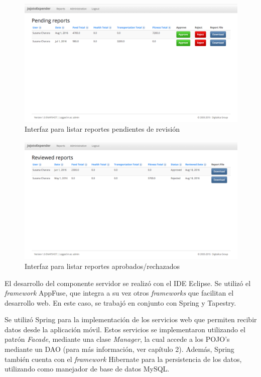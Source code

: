 \begin{figure}[ht]
  \centering
  \includegraphics[scale=0.45,type=png,ext=.png,read=.png]{imagenes/pending_reports}
  \caption{Interfaz para listar reportes pendientes de revisión}
  \label{fig:interfazListarReportesPendientes}
\end{figure}

\begin{figure}[ht]
  \centering
  \includegraphics[scale=0.45,type=png,ext=.png,read=.png]{imagenes/reviewed_reports}
  \caption{Interfaz para listar reportes aprobados/rechazados}
  \label{fig:interfazListarReportesRevisados}
\end{figure}

El desarrollo del componente servidor se realizó con el IDE Eclipse. Se utilizó el \textit{framework} AppFuse, que integra a su vez otros \textit{frameworks} que facilitan el desarrollo web. En este caso, se trabajó en conjunto con Spring y Tapestry.

Se utilizó Spring para la implementación de los servicios web que permiten recibir datos desde la aplicación móvil. Estos servicios se implementaron utilizando el patrón \textit{Facade}, mediante una clase \textit{Manager}, la cual accede a los POJO's mediante un DAO (para más información, ver capítulo 2). Además, Spring también cuenta con el \textit{framework} Hibernate para la persistencia de los datos, utilizando como manejador de base de datos MySQL.


